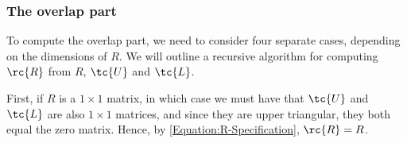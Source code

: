 \subsubsection{The overlap part}
\label{Section:Two-Step-Splitting}
To compute the overlap part, we need to consider four separate cases, depending on the dimensions of $R$. We will outline a recursive algorithm for computing $\rc{R}$ from $R$, $\tc{U}$ and $\tc{L}$. %

First, if $R$ is a $1 \times 1$ matrix, in which case we must have that $\tc{U}$ and $\tc{L}$ are also $1 \times 1$ matrices, and since they are upper triangular, they both equal the zero matrix. Hence, by \eqref{Equation:R-Specification}, $\rc{R} = R$.%

